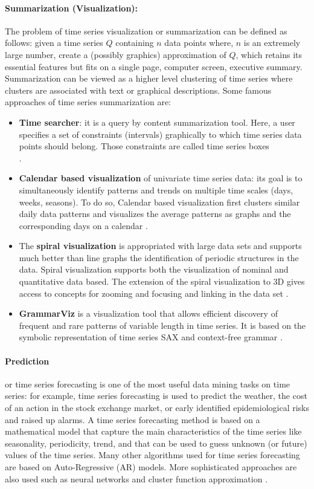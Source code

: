 \paragraph{Summarization (Visualization):}
The problem of time series visualization or summarization can be defined as follows: given a time series $Q$ containing $n$ data points where, $n$ is an extremely large number, create a (possibly graphics) approximation of $Q$, which retains its essential features but fits on a single page, computer screen, executive summary. Summarization can be viewed as a higher level clustering of time series  where clusters are associated with text or graphical descriptions. Some famous approaches of time series summarization  are:
\begin{itemize}

\item    \textbf{Time searcher}: it is a query by content summarization tool. Here, a user specifies a set of constraints (intervals) graphically to which time series data points should belong. Those constraints are called time series boxes \\ \cite{hochheiser2003interactive}.
\item    \textbf{Calendar based visualization} of univariate time series data: its goal is to simultaneously identify patterns and trends on multiple time scales (days, weeks, seasons). To do so, Calendar based visualization first clusters similar daily data patterns and visualizes the average patterns as graphs and the corresponding days on a calendar \cite{van1999cluster}. 
\item    The \textbf{spiral visualization} is appropriated with large data sets and supports much better than line graphs the identification of periodic structures in the data. Spiral visualization supports both the visualization of nominal and quantitative data based. The extension of the spiral visualization to 3D gives access to concepts for zooming and focusing and linking in the data set \cite{weber2001visualizing}. 
\item    \textbf{GrammarViz} is a visualization tool that allows efficient discovery of frequent and rare patterns  of variable length in time series. It is based on the symbolic representation of time series SAX and context-free grammar \cite{senin2014grammarviz}.
\end{itemize} 

\paragraph{Prediction} or time series forecasting is one of the most useful data mining tasks on time series: for example, time series forecasting is used to predict the weather, the cost of an action in the stock exchange market, or early identified epidemiological risks and raised up alarms. A time series forecasting method is based on a mathematical model that capture the main characteristics of the time series like seasonality, periodicity, trend, and that can be used to guess unknown (or future) values of the time series. Many other algorithms used for time series forecasting are based on Auto-Regressive (AR) models. More sophisticated approaches are also used such as neural networks and cluster function approximation \cite{mahalakshmi2016survey}.
